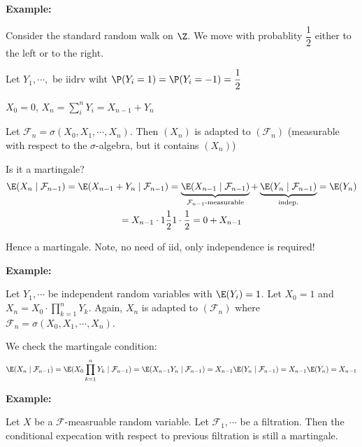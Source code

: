 \par\bigskip
\noindent\textbf{Example:}\par
\noindent Consider the standard random walk on $\Z$. We move with probablity $\dfrac{1}{2}$ either to the left or to the right. \par
\noindent Let $Y_1,\cdots, $ be iidrv wiht $\P(Y_i = 1) = \P(Y_i=-1) = \dfrac{1}{2}$\par
\noindent $X_0 =0$, $X_n = \sum_{i}^{n}Y_i = X_{n-1}+Y_n$\par
\noindent Let $\mathcal{F}_n = \sigma(X_0,X_1,\cdots,X_n)$. Then $(X_n)$ is adapted to $(\mathcal{F}_n)$ (measurable with respect to the $\sigma$-algebra, but it contains $(X_n)$)\par
\noindent Is it a martingale?
\begin{equation*}
  \begin{gathered}
    \E(X_n\mid\mathcal{F}_{n-1}) = \E(X_{n-1}+Y_n\mid\mathcal{F}_{n-1}) = \underbrace{\E(X_{n-1}\mid\mathcal{F}_{n-1})}_{\mathcal{F}_{n-1}\text{-measurable}}+\underbrace{\E(Y_n\mid\mathcal{F}_{n-1})}_{\text{indep.}} = \E(Y_n)\\
    = X_{n-1}\cdot1\dfrac{1}{2}1\cdot\dfrac{1}{2} = 0+X_{n-1}
  \end{gathered}
\end{equation*}\par
\noindent Hence a martingale. Note, no need of iid, only independence is required!
\par\bigskip
\noindent\textbf{Example:}\par
\noindent Let $Y_1,\cdots$ be independent random variables with $\E(Y_i) = 1$. Let $X_0 = 1$ and $X_n = X_0\cdot\prod_{k=1}^{n}Y_k$. Again, $X_n$ is adapted to $(\mathcal{F}_n)$ where $\mathcal{F}_n = \sigma(X_0,X_1,\cdots,X_n)$.\par
\noindent We check the martingale condition:
\begin{equation*}
  \begin{gathered}
    \E(X_n\mid\mathcal{F}_{n-1}) = \E(X_0\prod_{k=1}^{n}Y_k\mid\mathcal{F}_{n-1}) = \E(X_{n-1}Y_n\mid\mathcal{F}_{n-1}) = X_{n-1}\E(Y_n\mid\mathcal{F}_{n-1}) = X_{n-1}\E(Y_n) = X_{n-1}
  \end{gathered}
\end{equation*}
\par\bigskip
\noindent\textbf{Example:}\par
\noindent Let $X$ be a $\mathcal{F}$-measruable random variable. Let $\mathcal{F}_1,\cdots$ be a filtration. Then the conditional expecation with respect to previous filtration is still a martingale.\par
